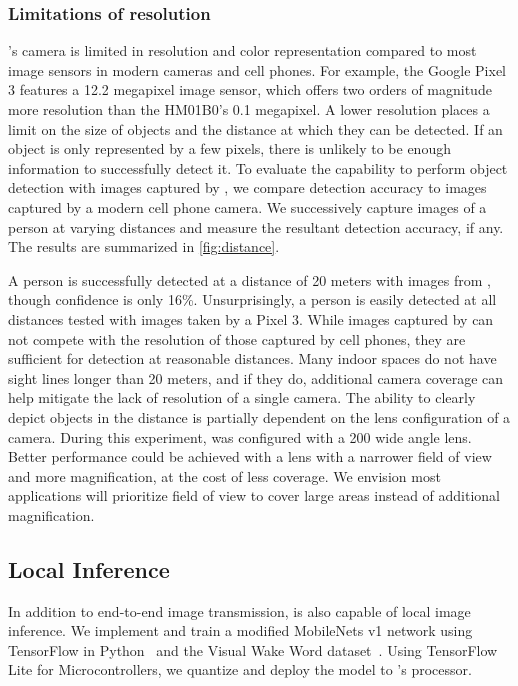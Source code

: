 \subsubsection{Limitations of resolution}
\name{}'s camera is limited in resolution and color representation compared to most image sensors in modern cameras and cell phones. For example, the Google Pixel 3 features a 12.2 megapixel image sensor, which offers two orders of magnitude more resolution than the HM01B0's 0.1 megapixel. A lower resolution places a limit on the size of objects and the distance at which they can be detected. If an object is only represented by a few pixels, there is unlikely to be enough information to successfully detect it. To evaluate the capability to perform object detection with images captured by \name{}, we compare detection accuracy to images captured by a modern cell phone camera. We successively capture images of a person at varying distances and measure the resultant detection accuracy, if any. The results are summarized in \cref{fig:distance}.

A person is successfully detected at a distance of 20 meters with images from \name{}, though confidence is only 16\%. Unsurprisingly, a person is easily detected at all distances tested with images taken by a Pixel 3. While images captured by \name{} can not compete with the resolution of those captured by cell phones, they are sufficient for detection at reasonable distances. Many indoor spaces do not have sight lines longer than 20 meters, and if they do, additional camera coverage can help mitigate the lack of resolution of a single camera. The ability to clearly depict objects in the distance is partially dependent on the lens configuration of a camera. During this experiment, \name{} was configured with a 200\textdegree\xspace wide angle lens. Better performance could be achieved with a lens with a narrower field of view and more magnification, at the cost of less coverage. We envision most applications will prioritize field of view to cover large areas instead of additional magnification.


\subsection{Local Inference}
\label{eval:localinf}
In addition to end-to-end image transmission, \name is also capable of local image inference. We implement and train a modified MobileNets v1 network using TensorFlow in Python~\cite{tensorflow2015-whitepaper} and the Visual Wake Word dataset~\cite{chowdhery2019visual}. Using TensorFlow Lite for Microcontrollers, we quantize and deploy the model to \name's processor.

